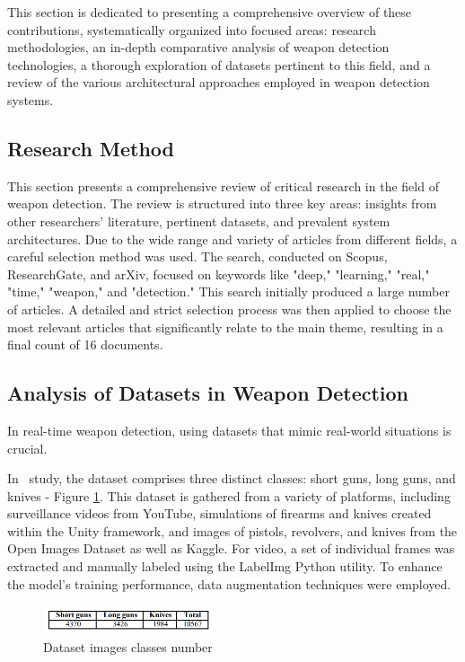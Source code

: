This section is dedicated to presenting a comprehensive overview of these contributions, systematically organized 
into focused areas: research methodologies, an in-depth comparative analysis of weapon detection technologies, a 
thorough exploration of datasets pertinent to this field, and a review of the various architectural approaches 
employed in weapon detection systems.

\subsection{Research Method}
This section presents a comprehensive review of critical research in the field of weapon detection. 
The review is structured into three key areas: insights from other 
researchers' literature, pertinent datasets, and prevalent system architectures. Due to the wide range 
and variety of articles from different fields, a careful selection method was used. The search, conducted on 
Scopus, ResearchGate, and arXiv, focused on keywords like "deep," "learning," "real," "time," "weapon," and 
"detection." This search initially produced a large number of articles. A detailed and strict selection process 
was then applied to choose the most relevant articles that significantly relate to the main theme, 
resulting in a final count of 16 documents.

\subsection{Analysis of Datasets in Weapon Detection}
In real-time weapon detection, using datasets that mimic real-world situations is crucial.

In~\citet{rfc3} study, the dataset comprises three distinct classes: short guns, long guns, and knives - Figure \ref{fig:rehman-dataset}. This dataset is gathered from a variety of platforms, including surveillance videos from YouTube, simulations of firearms and knives created within the Unity framework, and images of pistols, revolvers, and knives from the Open Images Dataset as well as Kaggle. For video, a set of individual frames was extracted and manually labeled using the LabelImg Python utility. To enhance the model's training performance, data augmentation techniques were employed.

\begin{figure}[h]
    \centering 
    \includegraphics[width=0.45\textwidth]{figs/rheman-dataset.png} 
    \caption{Dataset images classes number~\cite{rfc3} }
    \label{fig:rehman-dataset}
\end{figure}

